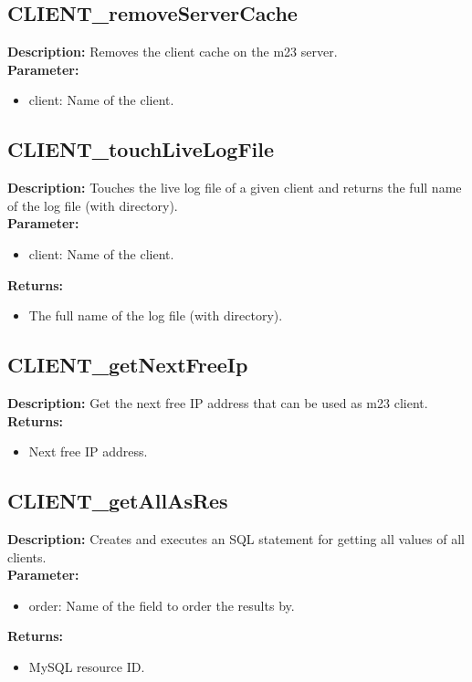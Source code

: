 \subsection{CLIENT\_removeServerCache}
\textbf{Description:} Removes the client cache on the m23 server.\\
\textbf{Parameter:}
\begin{itemize}
\item client: Name of the client.
\end{itemize}

\subsection{CLIENT\_touchLiveLogFile}
\textbf{Description:} Touches the live log file of a given client and returns the full name of the log file (with directory).\\
\textbf{Parameter:}
\begin{itemize}
\item client: Name of the client.
\end{itemize}
\textbf{Returns:}
\begin{itemize}
\item The full name of the log file (with directory).
\end{itemize}

\subsection{CLIENT\_getNextFreeIp}
\textbf{Description:} Get the next free IP address that can be used as m23 client.\\
\textbf{Returns:}
\begin{itemize}
\item Next free IP address.
\end{itemize}

\subsection{CLIENT\_getAllAsRes}
\textbf{Description:} Creates and executes an SQL statement for getting all values of all clients.\\
\textbf{Parameter:}
\begin{itemize}
\item order: Name of the field to order the results by.
\end{itemize}
\textbf{Returns:}
\begin{itemize}
\item MySQL resource ID.
\end{itemize}

